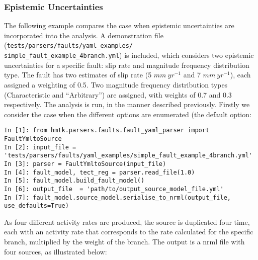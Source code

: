 \subsubsection{Epistemic Uncertainties}

The following example compares the case when epistemic uncertainties are incorporated into the analysis. A demonstration file (\verb=tests/parsers/faults/yaml_examples/=\\
\verb=simple_fault_example_4branch.yml=) is included, which considers two epistemic uncertainties for a specific fault: slip rate and magnitude frequency distribution type. The fault has two estimates of slip rate (5 $mm \ yr^{-1}$ and 7 $mm\ yr^{-1}$), each assigned a weighting of 0.5. Two magnitude frequency distribution types (Characteristic and \cite{AndersonLuco1983} ``Arbitrary'') are assigned, with weights of 0.7 and 0.3 respectively. The analysis is run, in the manner described previously. Firstly we consider the case when the different options are enumerated (the default option:

\begin{Verbatim}[frame=single, commandchars=\\\{\}, fontsize=\scriptsize]
In [1]: from hmtk.parsers.faults.fault_yaml_parser import FaultYmltoSource
In [2]: input_file = 'tests/parsers/faults/yaml_examples/simple_fault_example_4branch.yml'
In [3]: parser = FaultYmltoSource(input_file) 
In [4]: fault_model, tect_reg = parser.read_file(1.0)
In [5]: fault_model.build_fault_model()
In [6]: output_file  = 'path/to/output_source_model_file.yml'
In [7]: fault_model.source_model.serialise_to_nrml(output_file, use_defaults=True)
\end{Verbatim}

As four different activity rates are produced, the source is duplicated four time, each with an activity rate that corresponds to the rate calculated for the specific branch, multiplied by the weight of the branch. The output is a nrml file with four sources, as illustrated below:

